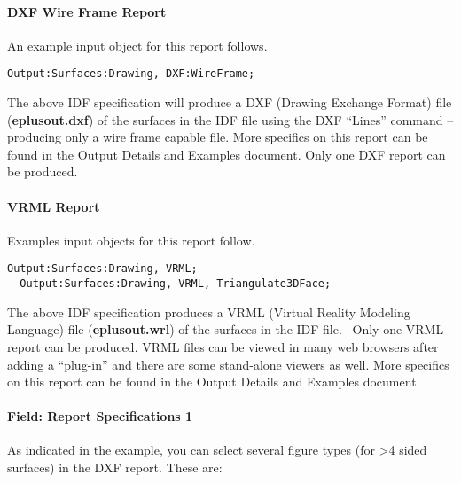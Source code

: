 \paragraph{DXF Wire Frame Report}\label{dxf-wire-frame-report}

An example input object for this report follows.

\begin{lstlisting}
Output:Surfaces:Drawing, DXF:WireFrame;
\end{lstlisting}

The above IDF specification will produce a DXF (Drawing Exchange Format) file (\textbf{eplusout.dxf}) of the surfaces in the IDF file using the DXF ``Lines'' command -- producing only a wire frame capable file. More specifics on this report can be found in the Output Details and Examples document. Only one DXF report can be produced.

\paragraph{VRML Report}\label{vrml-report}

Examples input objects for this report follow.

\begin{lstlisting}
Output:Surfaces:Drawing, VRML;
  Output:Surfaces:Drawing, VRML, Triangulate3DFace;
\end{lstlisting}

The above IDF specification produces a VRML (Virtual Reality Modeling Language) file (\textbf{eplusout.wrl}) of the surfaces in the IDF file.~ Only one VRML report can be produced. VRML files can be viewed in many web browsers after adding a ``plug-in'' and there are some stand-alone viewers as well. More specifics on this report can be found in the Output Details and Examples document.

\paragraph{Field: Report Specifications 1}\label{field-report-specifications-1-1}

As indicated in the example, you can select several figure types (for \textgreater{}4 sided surfaces) in the DXF report. These are:

